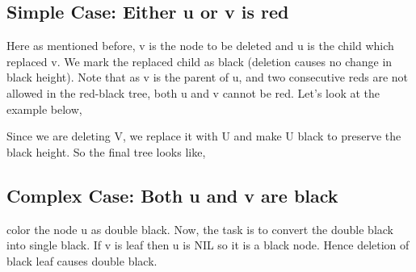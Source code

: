 \documentclass{article}
\begin{document}
\subsection{Simple Case: Either u or v is red}
Here as mentioned before, v is the node to be deleted and u is the child which replaced v. We mark the replaced child as black (deletion causes no change in black height). Note that as v is the parent of u, and two consecutive reds are not allowed in the red-black tree, both u and v cannot be red.
Let's look at the example below,

\begin{center}
\end{center}
Since we are deleting V, we replace it with U and make U black to preserve the black height. So the final tree looks like,
\begin{center}
\end{center}

\subsection{Complex Case: Both u and v are black}
color the node u as double black. Now, the task is to convert the double black into single black. If v is leaf then u is NIL so it is a black node. Hence deletion of black leaf causes double black.
\end{document}
